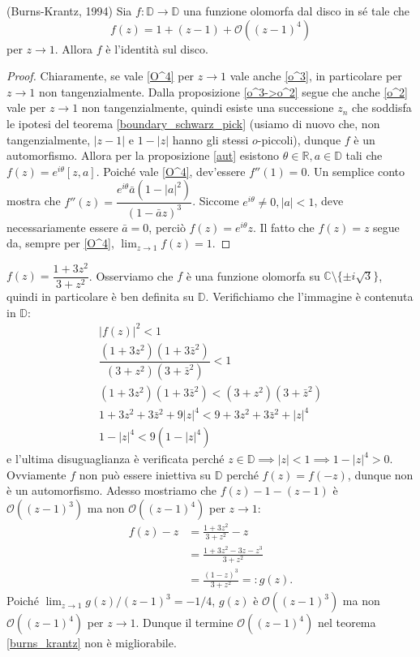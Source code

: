 \begin{thm} \label{burns_krantz}
  (Burns-Krantz, 1994) Sia $f:\mathbb{D} \longrightarrow \mathbb{D}$ una funzione olomorfa dal disco in sé tale che
  \begin{equation} \label{O^4}
    f(z)=1+(z-1)+\mathcal{O}((z-1)^4)
  \end{equation}
  per $z \longrightarrow 1$. Allora $f$ è l'identità sul disco.
\end{thm}

\begin{proof}
  Chiaramente, se vale \eqref{O^4} per $z \longrightarrow 1$ vale anche \eqref{o^3}, in particolare per $z \longrightarrow 1$ non tangenzialmente.
  Dalla proposizione \ref{o^3->o^2} segue che anche \eqref{o^2} vale per $z \longrightarrow 1$ non tangenzialmente, quindi esiste una successione $z_n$ che soddisfa le ipotesi del teorema \ref{boundary_schwarz_pick} (usiamo di nuovo che, non tangenzialmente, $|z-1|$ e $1-|z|$ hanno gli stessi $o$-piccoli), dunque $f$ è un automorfismo.
  Allora per la proposizione \ref{aut} esistono $\theta \in \mathbb{R}, a \in \mathbb{D}$ tali che $f(z)=e^{i\theta}[z,a]$. Poiché vale \eqref{O^4}, dev'essere $f''(1)=0$. Un semplice conto mostra che $f''(z)=\dfrac{e^{i\theta}\bar{a}(1-|a|^2)}{(1-\bar{a}z)^3}$.
  Siccome $e^{i\theta}\not=0, |a|<1$, deve necessariamente essere $\bar{a}=0$, perciò $f(z)=e^{i\theta}z$. Il fatto che $f(z)=z$ segue da, sempre per \eqref{O^4}, $\displaystyle \lim_{z \longrightarrow 1} f(z)=1$.
\end{proof}

\begin{ex}
  $f(z)=\dfrac{1+3z^2}{3+z^2}$. Osserviamo che $f$ è una funzione olomorfa su $\mathbb{C} \setminus \{\pm i\sqrt{3}\}$, quindi in particolare è ben definita su $\mathbb{D}$. Verifichiamo che l'immagine è contenuta in $\mathbb{D}$:
  \begin{align*}
    |f(z)|^2<1 \\
    \dfrac{(1+3z^2)(1+3\bar{z}^2)}{(3+z^2)(3+\bar{z}^2)} < 1 \\
    (1+3z^2)(1+3\bar{z}^2) < (3+z^2)(3+\bar{z}^2) \\
    1+3z^2+3\bar{z}^2+9|z|^4 < 9+3z^2+3\bar{z}^2+|z|^4 \\
    1-|z|^4 < 9(1-|z|^4)
  \end{align*}
  e l'ultima disuguaglianza è verificata perché $z \in \mathbb{D} \implies |z|<1 \implies 1-|z|^4>0$. \\
  Ovviamente $f$ non può essere iniettiva su $\mathbb{D}$ perché $f(z)=f(-z)$, dunque non è un automorfismo. Adesso mostriamo che $f(z)-1-(z-1)$ è $\mathcal{O}((z-1)^3)$ ma non $\mathcal{O}((z-1)^4)$ per $z \longrightarrow 1$:
  \begin{align*}
    f(z)-z & =\frac{1+3z^2}{3+z^2}-z \\
    & =\frac{1+3z^2-3z-z^3}{3+z^2} \\
    & =\frac{(1-z)^3}{3+z^2}=:g(z).
  \end{align*}
  Poiché $\displaystyle \lim_{z \longrightarrow 1} g(z)/(z-1)^3=-1/4$, $g(z)$ è $\mathcal{O}((z-1)^3)$ ma non $\mathcal{O}((z-1)^4)$ per $z \longrightarrow 1$. Dunque il termine $\mathcal{O}((z-1)^4)$ nel teorema \ref{burns_krantz} non è migliorabile.
\end{ex}
